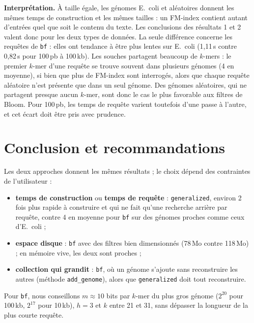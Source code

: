 \documentclass[11pt,a4paper]{article}
\begin{document}
\textbf{Interprétation.} À taille égale, les génomes E.~coli et aléatoires
donnent les mêmes temps de construction et les mêmes tailles : un FM-index
contient autant d'entrées quel que soit le contenu du texte. Les conclusions
des résultats 1 et 2 valent donc pour les deux types de données. La seule
différence concerne les requêtes de \texttt{bf} : elles ont tendance à être
plus lentes sur E.~coli (1,11\,s contre 0,82\,s pour 100\,pb à 100\,kb). Les
souches partagent beaucoup de $k$-mers : le premier $k$-mer d'une requête se
trouve souvent dans plusieurs génomes (4 en moyenne), si bien que plus de
FM-index sont interrogés, alors que chaque requête aléatoire n'est présente
que dans un seul génome.
Des génomes aléatoires, qui ne partagent presque aucun $k$-mer, sont donc le
cas le plus favorable aux filtres de Bloom. Pour 100\,pb, les temps de
requête varient toutefois d'une passe à l'autre, et cet écart doit être pris
avec prudence.

\section{Conclusion et recommandations}
\label{sec:conclusion}

Les deux approches donnent les mêmes résultats ; le choix dépend des
contraintes de l'utilisateur :
\begin{itemize}
\item \textbf{temps de construction} ou \textbf{temps de requête} :
\texttt{generalized}, environ 2 fois plus rapide à construire et qui ne fait
qu'une recherche arrière par requête, contre 4 en moyenne pour \texttt{bf}
sur des génomes proches comme ceux d'E.~coli ;
\item \textbf{espace disque} : \texttt{bf} avec des filtres bien
dimensionnés (78\,Mo contre 118\,Mo) ; en mémoire vive, les deux sont
proches ;
\item \textbf{collection qui grandit} : \texttt{bf}, où un génome s'ajoute
sans reconstruire les autres (méthode \texttt{add\_\allowbreak genome}),
alors que \texttt{generalized} doit tout reconstruire.
\end{itemize}

Pour \texttt{bf}, nous conseillons $m \approx 10$ bits par $k$-mer du plus
gros génome ($2^{20}$ pour 100\,kb, $2^{17}$ pour 10\,kb), $h = 3$ et
$k$ entre 21 et 31, sans dépasser la longueur de la plus courte requête.
\end{document}
